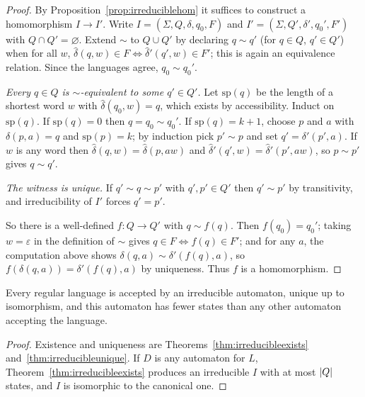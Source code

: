\documentclass[a4paper]{scrartcl}
\newcommand{\eps}{\varepsilon}
\begin{document}
\begin{proof}
	By Proposition~\ref{prop:irreduciblehom} it suffices to construct a homomorphism $I \to I'$. Write $I = (\Sigma, Q, \delta, q_0, F)$ and $I' = (\Sigma, Q', \delta', q_0', F')$ with $Q \cap Q' = \varnothing$. Extend $\sim$ to $Q \cup Q'$ by declaring $q \sim q'$ (for $q \in Q$, $q' \in Q'$) when for all $w$, $\hat\delta(q,w) \in F \iff \hat\delta'(q',w) \in F'$; this is again an equivalence relation. Since the languages agree, $q_0 \sim q_0'$.

	\emph{Every $q \in Q$ is $\sim$-equivalent to some $q' \in Q'$.} Let $\mathrm{sp}(q)$ be the length of a shortest word $w$ with $\hat\delta(q_0,w) = q$, which exists by accessibility. Induct on $\mathrm{sp}(q)$. If $\mathrm{sp}(q) = 0$ then $q = q_0 \sim q_0'$. If $\mathrm{sp}(q) = k+1$, choose $p$ and $a$ with $\delta(p,a) = q$ and $\mathrm{sp}(p) = k$; by induction pick $p' \sim p$ and set $q' = \delta'(p',a)$. If $w$ is any word then $\hat\delta(q,w) = \hat\delta(p,aw)$ and $\hat\delta'(q',w) = \hat\delta'(p',aw)$, so $p \sim p'$ gives $q \sim q'$.

	\emph{The witness is unique.} If $q' \sim q \sim p'$ with $q',p' \in Q'$ then $q' \sim p'$ by transitivity, and irreducibility of $I'$ forces $q' = p'$.

	So there is a well-defined $f \colon Q \to Q'$ with $q \sim f(q)$. Then $f(q_0) = q_0'$; taking $w = \eps$ in the definition of $\sim$ gives $q \in F \iff f(q) \in F'$; and for any $a$, the computation above shows $\delta(q,a) \sim \delta'(f(q),a)$, so $f(\delta(q,a)) = \delta'(f(q),a)$ by uniqueness. Thus $f$ is a homomorphism.
\end{proof}

\begin{corollary}
	Every regular language is accepted by an irreducible automaton, unique up to isomorphism, and this automaton has fewer states than any other automaton accepting the language.
\end{corollary}

\begin{proof}
	Existence and uniqueness are Theorems~\ref{thm:irreducibleexists} and~\ref{thm:irreducibleunique}. If $D$ is any automaton for $L$, Theorem~\ref{thm:irreducibleexists} produces an irreducible $I$ with at most $\lvert Q\rvert$ states, and $I$ is isomorphic to the canonical one.
\end{proof}
\end{document}
